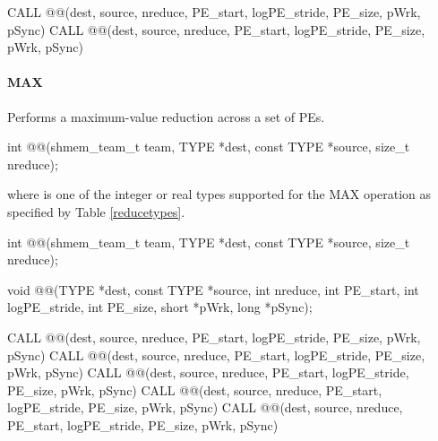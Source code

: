 \begin{apidefinition}
\begin{Fsynopsis}
CALL @@(dest, source, nreduce, PE_start, logPE_stride, PE_size, pWrk, pSync)
CALL @@(dest, source, nreduce, PE_start, logPE_stride, PE_size, pWrk, pSync)
\end{Fsynopsis}

\paragraph{MAX}
Performs a maximum-value reduction across a set of \acp{PE}.\newline

{\color{Green}
\begin{C11synopsis}
int @@(shmem_team_t team, TYPE *dest, const TYPE *source, size_t nreduce);
\end{C11synopsis}
where \TYPE{} is one of the integer or real types supported for the MAX operation as specified by Table \ref{reducetypes}.
}

\begin{Csynopsis}
\end{Csynopsis}
{\color{Green}
\begin{CsynopsisCol}
int @@(shmem_team_t team, TYPE *dest, const TYPE *source, size_t nreduce);
\end{CsynopsisCol}
}
\begin{DeprecateBlock}
\begin{CsynopsisCol}
void @@(TYPE *dest, const TYPE *source, int nreduce, int PE_start, int logPE_stride, int PE_size, short *pWrk, long *pSync);
\end{CsynopsisCol}
\end{DeprecateBlock}

\begin{Fsynopsis}
CALL @@(dest, source, nreduce, PE_start, logPE_stride, PE_size, pWrk, pSync)
CALL @@(dest, source, nreduce, PE_start, logPE_stride, PE_size, pWrk, pSync)
CALL @@(dest, source, nreduce, PE_start, logPE_stride, PE_size, pWrk, pSync)
CALL @@(dest, source, nreduce, PE_start, logPE_stride, PE_size, pWrk, pSync)
CALL @@(dest, source, nreduce, PE_start, logPE_stride, PE_size, pWrk, pSync)
\end{Fsynopsis}


\end{apidefinition}
